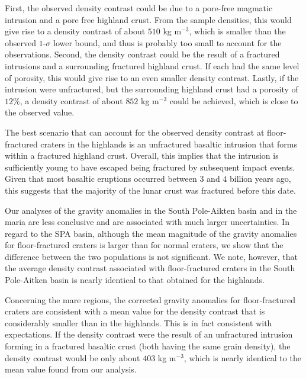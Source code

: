 First,  the observed  density contrast  could  be due  to a  pore-free
magmatic intrusion  and a  pore free highland  crust. From  the sample
densities, this would  give rise to a density contrast  of about $510$
kg m$^{-3}$,  which is  smaller than  the observed  $1$-$\sigma$ lower
bound, and thus is probably too small to account for the observations.
Second,  the density  contrast  could  be the  result  of a  fractured
intrusions and  a surrounding fractured  highland crust.  If  each had
the same  level of porosity, this  would give rise to  an even smaller
density contrast.  Lastly, if the  intrusion were unfractured, but the
surrounding  highland  crust  had  a porosity  of  $12\%$,  a  density
contrast of about $852$ kg m$^{-3}$  could be achieved, which is close
to the observed value.

The best scenario  that can account for the  observed density contrast
at floor-fractured craters in the highlands is an unfractured basaltic
intrusion that forms within a fractured highland crust.  Overall, this
implies that the intrusion is sufficiently young to have escaped being
fractured  by  subsequent impact  events.   Given  that most  basaltic
eruptions  occurred  between  $3$  and $4$  billion  years  ago,  this
suggests that  the majority  of the lunar  crust was  fractured before
this date.

Our analyses of  the gravity anomalies in the  South Pole-Aikten basin
and in  the maria  are less  conclusive and  are associated  with much
larger uncertainties.  In  regard to the SPA basin,  although the mean
magnitude  of the  gravity  anomalies for  floor-fractured craters  is
larger than  for normal craters,  we show that the  difference between
the two  populations is not  significant.  We note, however,  that the
average density  contrast associated  with floor-fractured  craters in
the South Pole-Aitken  basin is nearly identical to  that obtained for
the highlands.

Concerning  the  mare regions,  the  corrected  gravity anomalies  for
floor-fractured  craters are  consistent  with a  mean  value for  the
density contrast that  is considerably smaller than  in the highlands.
This is in fact consistent with expectations.  If the density contrast
were the  result of  an unfractured intrusion  forming in  a fractured
basaltic  crust (both  having  the same  grain  density), the  density
contrast  would be  only  about  $403$ kg  m$^{-3}$,  which is  nearly
identical to the mean value found from our analysis.

